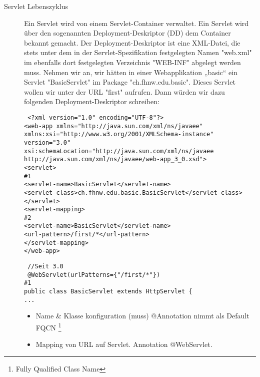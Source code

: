 \documentclass[a4paper,10pt]{scrreprt}
\begin{document}
\begin{description}
\item[Servlet Lebenszyklus] Ein Servlet wird von einem Servlet-Container verwaltet. Ein Servlet wird über den sogenannten
Deployment-Deskriptor (DD) dem Container bekannt gemacht. Der Deployment-Deskriptor ist eine
XML-Datei, die stets unter dem in der Servlet-Spezifikation festgelegten Namen "web.xml" im
ebenfalls dort festgelegten Verzeichnis "WEB-INF" abgelegt werden muss. Nehmen wir an, wir
hätten in einer Webapplikation „basic“ ein Servlet "BasicServlet" im Package "ch.fhnw.edu.basic".
Dieses Servlet wollen wir unter der URL "first" aufrufen. Dann würden wir dazu folgenden
Deployment-Deskriptor schreiben:

\begin{verbatim}
 <?xml version="1.0" encoding="UTF-8"?>
<web-app xmlns="http://java.sun.com/xml/ns/javaee"
xmlns:xsi="http://www.w3.org/2001/XMLSchema-instance" version="3.0"
xsi:schemaLocation="http://java.sun.com/xml/ns/javaee
http://java.sun.com/xml/ns/javaee/web-app_3_0.xsd">
<servlet>
#1
<servlet-name>BasicServlet</servlet-name>
<servlet-class>ch.fhnw.edu.basic.BasicServlet</servlet-class>
</servlet>
<servlet-mapping>
#2
<servlet-name>BasicServlet</servlet-name>
<url-pattern>/first/*</url-pattern>
</servlet-mapping>
</web-app>
\end{verbatim}
\begin{verbatim}
 //Seit 3.0
 @WebServlet(urlPatterns={"/first/*"})
#1
public class BasicServlet extends HttpServlet {
...
\end{verbatim}

\begin{itemize}
 \item Name \& Klasse konfiguration (muss) @Annotation nimmt als Default FQCN \footnote{Fully Qualified Class Name}
 \item Mapping von URL auf Servlet. Annotation @WebServlet.
\end{itemize}


\end{description}
\end{document}
